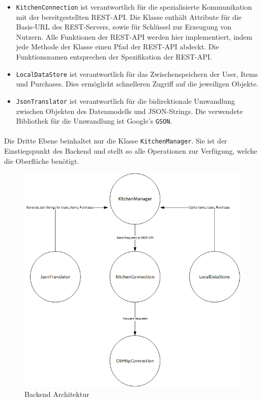 \documentclass{scrartcl}
\begin{document}
			\begin{itemize}
				\item  \texttt{KitchenConnection} ist verantwortlich für die spezialisierte Kommunikation mit der bereitgestellten REST-API. Die Klasse enthält Attribute für die Basis-URL des REST-Servers, sowie für Schlüssel zur Erzeugung von Nutzern. Alle Funktionen der REST-API werden hier implementiert, indem jede Methode der Klasse einen Pfad der REST-API abdeckt. Die Funktionsnamen entsprechen der Spezifikation der REST-API.
				
				\item \texttt{LocalDataStore} ist verantwortlich für das Zwischenspeichern der User, Items und Purchases. Dies ermöglicht schnelleren Zugriff auf die jeweiligen Objekte.
				
				\item \texttt{JsonTranslator} ist verantwortlich für die bidirektionale Umwandlung zwischen Objekten des Datenmodells und JSON-Strings. Die verwendete Bibliothek für die Umwandlung ist Google's \texttt{GSON}.
			\end{itemize}
		
			\paragraph*{}
			Die Dritte Ebene beinhaltet nur die Klasse \texttt{KitchenManager}. Sie ist der Einstiegspunkt des Backend und stellt so alle Operationen zur Verfügung, welche die Oberfläche benötigt.
		
			\begin{figure}[!h]
				\centering
				\label{backendArchitecture}
				\includegraphics[scale=0.5]{./figures/classStructure.png}
				\caption{Backend Architektur}
			\end{figure}
	
\end{document}
